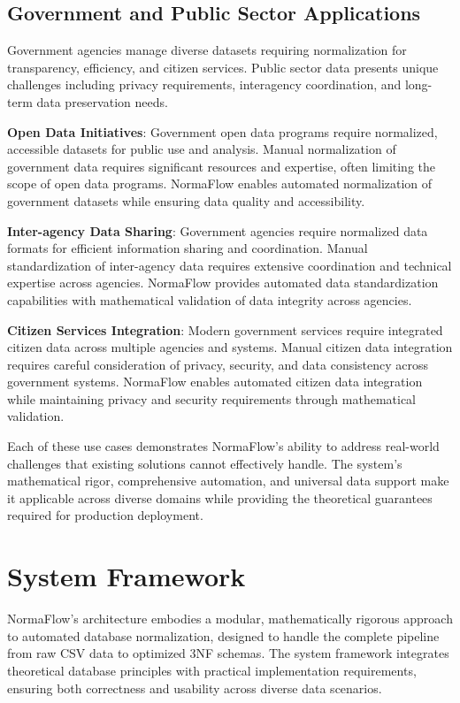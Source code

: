 \documentclass[acmsmall]{acmart}
\newcommand{\parab}[1]{\vspace{0.05in}\noindent\textbf{#1}}
\begin{document}
\subsection{Government and Public Sector Applications}

Government agencies manage diverse datasets requiring normalization for transparency, efficiency, and citizen services. Public sector data presents unique challenges including privacy requirements, interagency coordination, and long-term data preservation needs.

\parab{Open Data Initiatives}: Government open data programs require normalized, accessible datasets for public use and analysis. Manual normalization of government data requires significant resources and expertise, often limiting the scope of open data programs. NormaFlow enables automated normalization of government datasets while ensuring data quality and accessibility.

\parab{Inter-agency Data Sharing}: Government agencies require normalized data formats for efficient information sharing and coordination. Manual standardization of inter-agency data requires extensive coordination and technical expertise across agencies. NormaFlow provides automated data standardization capabilities with mathematical validation of data integrity across agencies.

\parab{Citizen Services Integration}: Modern government services require integrated citizen data across multiple agencies and systems. Manual citizen data integration requires careful consideration of privacy, security, and data consistency across government systems. NormaFlow enables automated citizen data integration while maintaining privacy and security requirements through mathematical validation.

Each of these use cases demonstrates NormaFlow's ability to address real-world challenges that existing solutions cannot effectively handle. The system's mathematical rigor, comprehensive automation, and universal data support make it applicable across diverse domains while providing the theoretical guarantees required for production deployment.

\section{System Framework}

NormaFlow's architecture embodies a modular, mathematically rigorous approach to automated database normalization, designed to handle the complete pipeline from raw CSV data to optimized 3NF schemas. The system framework integrates theoretical database principles with practical implementation requirements, ensuring both correctness and usability across diverse data scenarios.
\end{document}

